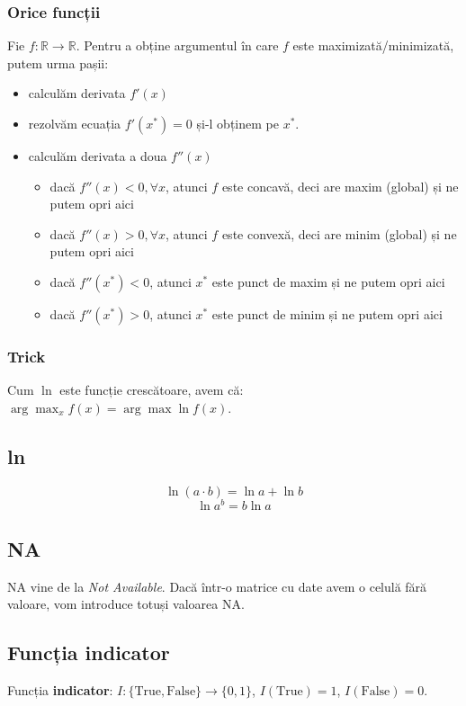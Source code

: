 \documentclass[12pt]{article}
\begin{document}
	\subsubsection{Orice funcții}
	Fie $f:\mathbb{R} \rightarrow \mathbb{R}$. Pentru a obține argumentul în care $f$ este maximizată/minimizată, putem urma pașii:
	\begin{itemize}
		\item calculăm derivata $f'(x)$
		\item rezolvăm ecuația $f'(x^*) = 0$ și-l obținem pe $x^*$.
		\item calculăm derivata a doua $f''(x)$
		\begin{itemize}
			\item dacă $f''(x) < 0, \forall x$, atunci $f$ este concavă, deci are maxim (global) și ne putem opri aici
			\item dacă $f''(x) > 0, \forall x$, atunci $f$ este convexă, deci are minim (global) și ne putem opri aici
			\item dacă $f''(x^*) < 0$, atunci $x^*$ este punct de maxim și ne putem opri aici
			\item dacă $f''(x^*) > 0$, atunci $x^*$ este punct de minim și ne putem opri aici
		\end{itemize}
	\end{itemize}
	\subsubsection{Trick}
	Cum $\ln$ este funcție crescătoare, avem că:
	$\arg\max_x f(x) = \arg \max \ln f(x)$.

	\subsection{ln}
	$$\ln(a\cdot b) = \ln a + \ln b$$
	$$\ln a^b = b\ln a$$
	\subsection{NA}
	NA vine de la \textit{Not Available}. Dacă într-o matrice cu date avem o celulă fără valoare, vom introduce totuși valoarea NA.
	
	\subsection{Funcția indicator}
	Funcția \textbf{indicator}: $I : \{\text{True},\text{False}\} \rightarrow \{0,1\}$, $I(\text{True}) = 1$, $I(\text{False}) = 0$.
	
\end{document}
